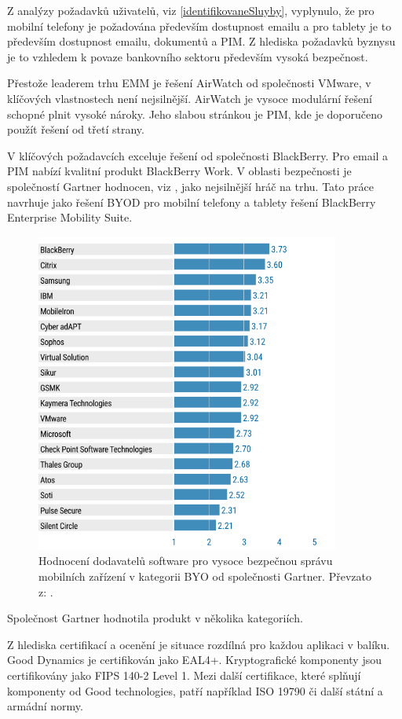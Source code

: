 Z analýzy požadavků uživatelů, viz \ref{identifikovaneSluyby}, vyplynulo, že pro mobilní telefony je požadována především dostupnost emailu a pro tablety je to především dostupnost emailu, dokumentů a PIM. Z hlediska požadavků byznysu je to vzhledem k povaze bankovního sektoru především vysoká bezpečnost.

Přestože leaderem trhu EMM je řešení AirWatch od společnosti VMware, v klíčových vlastnostech není nejsilnější. AirWatch je vysoce modulární řešení schopné plnit vysoké nároky. Jeho slabou stránkou je PIM, kde je doporučeno použít řešení od třetí strany.

V klíčových požadavcích exceluje řešení od společnosti BlackBerry. Pro email a PIM nabízí kvalitní produkt BlackBerry Work. V oblasti bezpečnosti je společností Gartner hodnocen, viz \cite{GartnerSecurity}, jako nejsilnější hráč na trhu. Tato práce navrhuje jako řešení BYOD pro mobilní telefony a tablety řešení BlackBerry Enterprise Mobility Suite.

\begin{figure}[h!]\label{GartnerBB}
\centering
\includegraphics[width=10cm]{img/GartnerBB}
\caption{Hodnocení dodavatelů software pro vysoce bezpečnou správu mobilních zařízení v kategorii BYO od společnosti Gartner. Převzato z: \cite{GartnerSecurity}.}
\end{figure} 

Společnost Gartner hodnotila produkt v několika kategoriích. 

Z hlediska certifikací a ocenění je situace rozdílná pro každou aplikaci v balíku. Good Dynamics je certifikován jako EAL4+. Kryptografické komponenty jsou certifikovány jako FIPS 140-2 Level 1. Mezi další certifikace, které splňují komponenty od Good technologies, patří například ISO 19790 či další státní a armádní normy.

